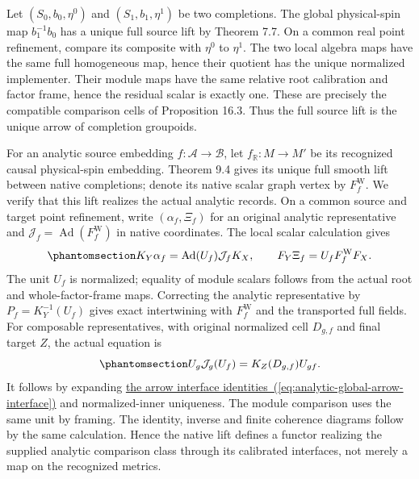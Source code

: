\documentclass[
  english,
  11pt,
  reqno]{amsart}
\begin{document}
Let \((S_0,b_0,\eta^0)\) and \((S_1,b_1,\eta^1)\) be two completions.
The global physical-spin map \(b_1^{-1}b_0\) has a unique full source
lift by Theorem 7.7. On a common real point refinement, compare its
composite with \(\eta^0\) to \(\eta^1\). The two local algebra maps have
the same full homogeneous map, hence their quotient has the unique
normalized implementer. Their module maps have the same relative root
calibration and factor frame, hence the residual scalar is exactly one.
These are precisely the compatible comparison cells of Proposition 16.3.
Thus the full source lift is the unique arrow of completion groupoids.

For an analytic source embedding \(f:\mathcal A\to\mathcal B\), let
\(f_{\mathbb R}:M\to M'\) be its recognized causal physical-spin
embedding. Theorem 9.4 gives its unique full smooth lift between native
completions; denote its native scalar graph vertex by
\(F_f^{\mathrm W}\). We verify that this lift realizes the actual
analytic records. On a common source and target point refinement, write
\((\alpha_f,\Xi_f)\) for an original analytic representative and
\(\mathcal J_f=\operatorname{Ad}(F_f^{\mathrm W})\) in native
coordinates. The local scalar calculation gives
\begin{equation}\protect\phantomsection\label{eq:analytic-global-arrow-interface}{
K_Y\alpha_f=\operatorname{Ad}(U_f)\mathcal J_fK_X,
\qquad
F_Y\Xi_f=U_fF_f^{\mathrm W}F_X.
}\end{equation} The unit \(U_f\) is normalized; equality of module
scalars follows from the actual root and whole-factor-frame maps.
Correcting the analytic representative by \(P_f=K_Y^{-1}(U_f)\) gives
exact intertwining with \(F_f^{\mathrm W}\) and the transported full
fields. For composable representatives, with original normalized cell
\(D_{g,f}\) and final target \(Z\), the actual equation is
\begin{equation}\protect\phantomsection\label{eq:analytic-global-arrow-composition-cell}{
U_g\mathcal J_g(U_f)=K_Z(D_{g,f})U_{gf}.
}\end{equation} It follows by expanding
\hyperref[eq:analytic-global-arrow-interface]{the arrow interface
identities~(\ref*{eq:analytic-global-arrow-interface})} and normalized-inner uniqueness. The module comparison uses
the same unit by framing. The identity, inverse and finite coherence
diagrams follow by the same calculation. Hence the native lift defines a
functor realizing the supplied analytic comparison class through its
calibrated interfaces, not merely a map on the recognized metrics.
\end{document}
